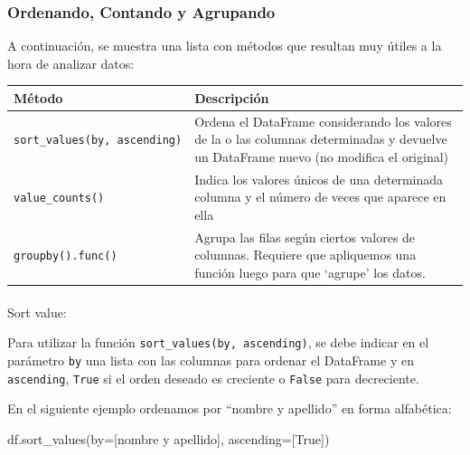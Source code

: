 \documentclass[
  letterpaper,
  DIV=11,
  numbers=noendperiod]{scrreprt}
\makeatletter
\let\oldparagraph\paragraph
\renewcommand{\paragraph}{
    \@ifstar
      \xxxParagraphStar
      \xxxParagraphNoStar
  }
\newcommand{\xxxParagraphStar}[1]{\oldparagraph*{#1}\mbox{}}
\newcommand{\xxxParagraphNoStar}[1]{\oldparagraph{#1}\mbox{}}
\newenvironment{Shaded}{\begin{snugshade}}{\end{snugshade}}
\newcommand{\NormalTok}[1]{\textcolor[rgb]{0.00,0.23,0.31}{#1}}
\newcommand{\OperatorTok}[1]{\textcolor[rgb]{0.37,0.37,0.37}{#1}}
\newcommand{\StringTok}[1]{\textcolor[rgb]{0.13,0.47,0.30}{#1}}
\newcommand{\VariableTok}[1]{\textcolor[rgb]{0.07,0.07,0.07}{#1}}
\makeatother
\begin{document}
\subsubsection{Ordenando, Contando y
Agrupando}\label{ordenando-contando-y-agrupando}

A continuación, se muestra una lista con métodos que resultan muy útiles
a la hora de analizar datos:

\begin{longtable}[]{@{}
  >{\raggedright\arraybackslash}p{}
  >{\raggedright\arraybackslash}p{}@{}}
\toprule\noalign{}
\begin{minipage}[b]{\linewidth}\raggedright
Método
\end{minipage} & \begin{minipage}[b]{\linewidth}\raggedright
Descripción
\end{minipage} \\
\midrule\noalign{}
\endhead
\bottomrule\noalign{}
\endlastfoot
\texttt{sort\_values(by,\ ascending)} & Ordena el DataFrame considerando
los valores de la o las columnas determinadas y devuelve un DataFrame
nuevo (no modifica el original) \\
\texttt{value\_counts()} & Indica los valores únicos de una determinada
columna y el número de veces que aparece en ella \\
\texttt{groupby().func()} & Agrupa las filas según ciertos valores de
columnas. Requiere que apliquemos una función luego para que `agrupe'
los datos. \\
\end{longtable}

\paragraph{Sort value:}\label{sort-value}

Para utilizar la función \texttt{sort\_values(by,\ ascending)}, se debe
indicar en el parámetro \texttt{by} una lista con las columnas para
ordenar el DataFrame y en \texttt{ascending}, \texttt{True} si el orden
deseado es creciente o \texttt{False} para decreciente.

En el siguiente ejemplo ordenamos por ``nombre y apellido'' en forma
alfabética:

\begin{Shaded}
\begin{Highlighting}[]
\NormalTok{df.sort\_values(by}\OperatorTok{=}\NormalTok{[}\StringTok{\textquotesingle{}nombre y apellido\textquotesingle{}}\NormalTok{], ascending}\OperatorTok{=}\NormalTok{[}\VariableTok{True}\NormalTok{])}
\end{Highlighting}
\end{Shaded}
\end{document}
